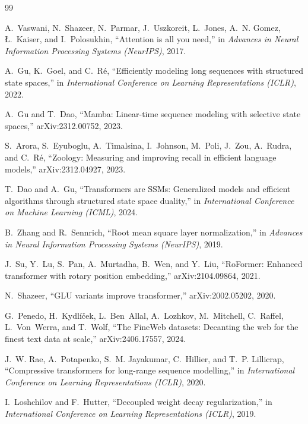 \documentclass[conference]{IEEEtran}
\begin{document}
\begin{thebibliography}{99}

A.~Vaswani, N.~Shazeer, N.~Parmar, J.~Uszkoreit, L.~Jones, A.~N. Gomez, {\L}.~Kaiser, and
I.~Polosukhin, ``Attention is all you need,'' in \emph{Advances in Neural Information Processing
Systems (NeurIPS)}, 2017.

A.~Gu, K.~Goel, and C.~R{\'e}, ``Efficiently modeling long sequences with structured state spaces,''
in \emph{International Conference on Learning Representations (ICLR)}, 2022.

A.~Gu and T.~Dao, ``Mamba: Linear-time sequence modeling with selective state spaces,''
arXiv:2312.00752, 2023.

S.~Arora, S.~Eyuboglu, A.~Timalsina, I.~Johnson, M.~Poli, J.~Zou, A.~Rudra, and C.~R{\'e}, ``Zoology:
Measuring and improving recall in efficient language models,'' arXiv:2312.04927, 2023.

T.~Dao and A.~Gu, ``Transformers are SSMs: Generalized models and efficient algorithms through
structured state space duality,'' in \emph{International Conference on Machine Learning (ICML)}, 2024.

B.~Zhang and R.~Sennrich, ``Root mean square layer normalization,'' in \emph{Advances in Neural
Information Processing Systems (NeurIPS)}, 2019.

J.~Su, Y.~Lu, S.~Pan, A.~Murtadha, B.~Wen, and Y.~Liu, ``RoFormer: Enhanced transformer with rotary
position embedding,'' arXiv:2104.09864, 2021.

N.~Shazeer, ``GLU variants improve transformer,'' arXiv:2002.05202, 2020.

G.~Penedo, H.~Kydl{\'i}{\v{c}}ek, L.~Ben~Allal, A.~Lozhkov, M.~Mitchell, C.~Raffel, L.~Von~Werra, and
T.~Wolf, ``The FineWeb datasets: Decanting the web for the finest text data at scale,''
arXiv:2406.17557, 2024.

J.~W. Rae, A.~Potapenko, S.~M. Jayakumar, C.~Hillier, and T.~P. Lillicrap, ``Compressive transformers
for long-range sequence modelling,'' in \emph{International Conference on Learning Representations
(ICLR)}, 2020.

I.~Loshchilov and F.~Hutter, ``Decoupled weight decay regularization,'' in \emph{International
Conference on Learning Representations (ICLR)}, 2019.


\end{thebibliography}
\end{document}

